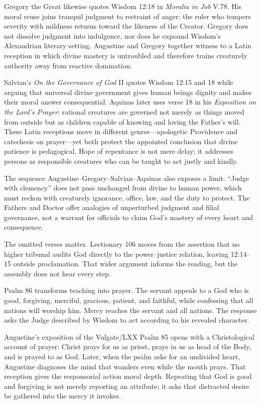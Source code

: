 Gregory the Great likewise quotes Wisdom 12:18 in \emph{Moralia in Job} V.78. His moral reuse joins tranquil judgment to restraint of anger: the ruler who tempers severity with mildness returns toward the likeness of the Creator. Gregory does not dissolve judgment into indulgence, nor does he expound Wisdom's Alexandrian literary setting. Augustine and Gregory together witness to a Latin reception in which divine mastery is untroubled and therefore trains creaturely authority away from reactive domination.

Salvian's \emph{On the Governance of God} II quotes Wisdom 12:15 and 18 while arguing that universal divine government gives human beings dignity and makes their moral answer consequential. Aquinas later uses verse 18 in his \emph{Exposition on the Lord's Prayer}: rational creatures are governed not merely as things moved from outside but as children capable of knowing and loving the Father's will. These Latin receptions move in different genres---apologetic Providence and catechesis on prayer---yet both protect the appointed conclusion that divine patience is pedagogical. Hope of repentance is not mere delay; it addresses persons as responsible creatures who can be taught to act justly and kindly.

The sequence Augustine--Gregory--Salvian--Aquinas also exposes a limit. “Judge with clemency” does not pass unchanged from divine to human power, which must reckon with creaturely ignorance, office, law, and the duty to protect. The Fathers and Doctor offer analogies of unperturbed judgment and filial governance, not a warrant for officials to claim God's mastery of every heart and consequence.

The omitted verses matter. Lectionary 106 moves from the assertion that no higher tribunal audits God directly to the power--justice relation, leaving 12:14--15 outside proclamation. That wider argument informs the reading, but the assembly does not hear every step.

Psalm 86 transforms teaching into prayer. The servant appeals to a God who is good, forgiving, merciful, gracious, patient, and faithful, while confessing that all nations will worship him. Mercy reaches the servant and all nations. The response asks the Judge described by Wisdom to act according to his revealed character.

Augustine's exposition of the Vulgate/LXX Psalm 85 opens with a Christological account of prayer: Christ prays for us as priest, prays in us as head of the Body, and is prayed to as God. Later, when the psalm asks for an undivided heart, Augustine diagnoses the mind that wanders even while the mouth prays. That reception gives the responsorial action moral depth. Repeating that God is good and forgiving is not merely reporting an attribute; it asks that distracted desire be gathered into the mercy it invokes.

